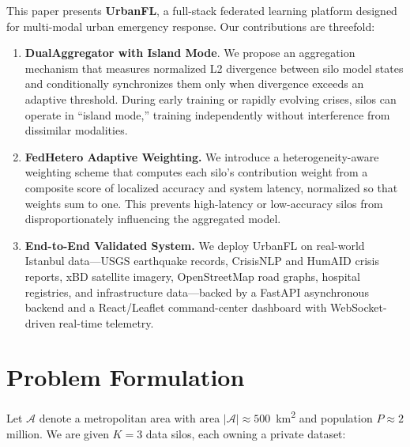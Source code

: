\documentclass[conference]{IEEEtran}
\begin{document}
This paper presents \textbf{UrbanFL}, a full-stack federated learning platform designed for multi-modal urban emergency response. Our contributions are threefold:

\begin{enumerate}
    \item \textbf{DualAggregator with Island Mode}. We propose an aggregation mechanism that measures normalized L2 divergence between silo model states and conditionally synchronizes them only when divergence exceeds an adaptive threshold. During early training or rapidly evolving crises, silos can operate in ``island mode,'' training independently without interference from dissimilar modalities.
    \item \textbf{FedHetero Adaptive Weighting.} We introduce a heterogeneity-aware weighting scheme that computes each silo's contribution weight from a composite score of localized accuracy and system latency, normalized so that weights sum to one. This prevents high-latency or low-accuracy silos from disproportionately influencing the aggregated model.
    \item \textbf{End-to-End Validated System.} We deploy UrbanFL on real-world Istanbul data---USGS earthquake records, CrisisNLP and HumAID crisis reports, xBD satellite imagery, OpenStreetMap road graphs, hospital registries, and infrastructure data---backed by a FastAPI asynchronous backend and a React/Leaflet command-center dashboard with WebSocket-driven real-time telemetry.
\end{enumerate}

\section{Problem Formulation}

Let $\mathcal{A}$ denote a metropolitan area with area $|\mathcal{A}| \approx 500$~km\textsuperscript{2} and population $P \approx 2$ million. We are given $K = 3$ data silos, each owning a private dataset:
\end{document}

